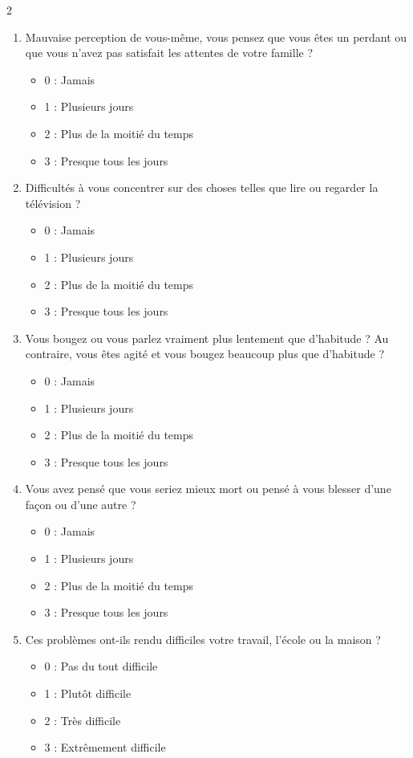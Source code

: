 \begin{multicols}{2}
\begin{enumerate}
	\item[6.] Mauvaise perception de vous-même, vous pensez que vous êtes un perdant ou que vous n’avez pas satisfait les attentes de votre famille ?
  	\begin{itemize}[label={$\bullet$}]
		\item 0 : Jamais 
		\item 1 : Plusieurs jours 
		\item 2 : Plus de la moitié du temps
		\item 3 : Presque tous les jours
	\end{itemize}
	
	\item[7.] Difficultés à vous concentrer sur des choses telles que lire ou regarder la télévision ?
  	\begin{itemize}[label={$\bullet$}]
		\item 0 : Jamais 
		\item 1 : Plusieurs jours 
		\item 2 : Plus de la moitié du temps
		\item 3 : Presque tous les jours
	\end{itemize}
	
	\item[8.]  Vous bougez ou vous parlez vraiment plus lentement que d'habitude ? Au contraire, vous êtes agité et vous bougez beaucoup plus que d’habitude ?
  	\begin{itemize}[label={$\bullet$}]
		\item 0 : Jamais 
		\item 1 : Plusieurs jours 
		\item 2 : Plus de la moitié du temps
		\item 3 : Presque tous les jours
	\end{itemize}

	\item[9.] Vous avez pensé que vous seriez mieux mort ou pensé à vous blesser d’une façon ou d’une autre ?
  	\begin{itemize}[label={$\bullet$}]
		\item 0 : Jamais 
		\item 1 : Plusieurs jours 
		\item 2 : Plus de la moitié du temps
		\item 3 : Presque tous les jours
	\end{itemize}

		\item[10.] Ces problèmes ont-ils rendu difficiles votre travail, l'école ou la maison ?
  	\begin{itemize}[label={$\bullet$}]
		\item 0 : Pas du tout difficile 
		\item 1 : Plutôt difficile 
		\item 2 : Très difficile
		\item 3 : Extrêmement difficile
	\end{itemize}

\end{enumerate}

\end{multicols}

